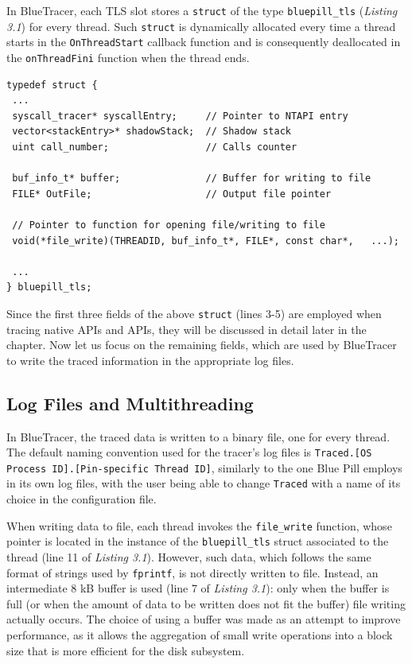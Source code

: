 \documentclass[binding=0.6cm,LaM,english,noexaminfo,oneside]{sapthesis} %
\begin{document}
In BlueTracer, each TLS slot stores a \texttt{struct} of the type \texttt{bluepill\_tls} (\textit{Listing 3.1}) for every thread. Such \texttt{struct} is dynamically allocated every time a thread starts in the \texttt{OnThreadStart} callback function and is consequently deallocated in the \texttt{onThreadFini} function when the thread ends.

\vspace{0.5cm}
\begin{lstlisting}[caption={Thread Local Data},captionpos=b]
typedef struct {
 ...
 syscall_tracer* syscallEntry;     // Pointer to NTAPI entry
 vector<stackEntry>* shadowStack;  // Shadow stack
 uint call_number;             	   // Calls counter							
 
 buf_info_t* buffer;		   	   // Buffer for writing to file				 
 FILE* OutFile;                    // Output file pointer
 
 // Pointer to function for opening file/writing to file	
 void(*file_write)(THREADID, buf_info_t*, FILE*, const char*, 	...);
 
 ...
} bluepill_tls;
\end{lstlisting}

Since the first three fields of the above \texttt{struct} (lines 3-5) are employed when tracing native APIs and APIs, they will be discussed in detail later in the chapter. Now let us focus on the remaining fields, which are used by BlueTracer to write the traced information in the appropriate log files. 

\subsection{Log Files and Multithreading}

In BlueTracer, the traced data is written to a binary file, one for every thread. The default naming convention used for the tracer's log files is \texttt{Traced.[OS Process ID].[Pin-specific Thread ID]}, similarly to the one Blue Pill employs in its own log files, with the user being able to change \texttt{Traced} with a name of its choice in the configuration file. 

When writing data to file, each thread invokes the \texttt{file\_write} function, whose pointer is located in the instance of the \texttt{bluepill\_tls} struct associated to the thread (line 11 of \textit{Listing 3.1}). However, such data, which follows the same format of strings used by \texttt{fprintf}, is not directly written to file. Instead, an intermediate 8 kB buffer is used (line 7 of \textit{Listing 3.1}): only when the buffer is full (or when the amount of data to be written does not fit the buffer) file writing actually occurs. The choice of using a buffer was made as an attempt to improve performance, as it allows the aggregation of small write operations into a block size that is more efficient for the disk subsystem.
\end{document}
